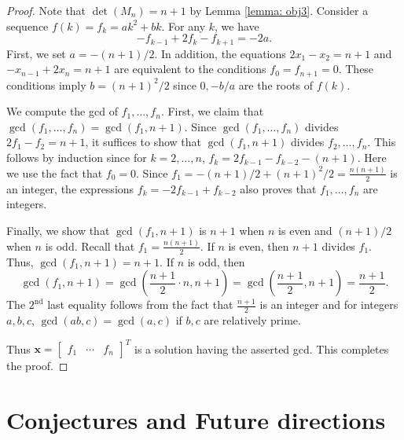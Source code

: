 \documentclass[11pt,reqno]{amsart}
\theoremstyle{definition}
\theoremstyle{plain}
\begin{document}
\begin{proof}
Note that $\det (M_n) = n+1$ by Lemma \ref{lemma: obj3}. Consider a sequence $f(k)=f_k  = ak^2 + bk$. 
For any $k$, we have
\[
-f_{k-1} + 2f_k - f_{k+1} = -2a.
\]
First, we set $a = -(n+1)/2$. 
In addition, the equations $2x_1 - x_2 = n+1$ and $-x_{n-1} + 2x_n = n+1$ are equivalent to the conditions $f_0 = f_{n+1} = 0$. 
These conditions imply $b = (n+1)^2/2$ since $0, -b/a$ are the roots of $f(k)$. 

We compute the gcd of $f_1,\dots, f_n$. 
First, we claim that $\gcd(f_1,\dots, f_n) = \gcd(f_1, n+1)$. 
Since $\gcd(f_1,\dots, f_n)$ divides $2f_1-f_2 = n+1$, 
it suffices to show that $\gcd(f_1, n+1)$ divides $f_2,\dots, f_n$. 
This follows by induction since for $k = 2, \dots, n$, 
$f_k = 2 f_{k-1} - f_{k-2} - (n+1)$.
Here we use the fact that $f_0 = 0$. 
Since $f_1 =  -(n+1)/2 + (n+1)^2/2 = \frac{n(n+1)}2$ is an integer, the expressions $f_k = -2 f_{k-1} + f_{k-2}$ also proves that $f_1, \dots, f_n$ are integers. 

Finally, we show that $\gcd(f_1, n+1)$ is $n+1$ when $n$ is even and $(n+1)/2$ when $n$ is odd. 
Recall that $f_1 = \frac{n(n+1)}2$.
If $n$ is even, then $n+1$ divides $f_1$. 
Thus, $\gcd(f_1, n+1) = n+1$. 
If $n$ is odd, then 
\[
\gcd(f_1, n+1) = \gcd(\frac{n+1}2 \cdot n, n+1) = \gcd(\frac{n+1}2, n+1) = \frac{n+1}2.
\] 
The $2^\textrm{nd}$ last equality follows from the fact that $\frac{n+1}2$ is an integer and for integers $a,b,c$, $\gcd(ab,c) = \gcd(a,c)$ if $b,c$ are relatively prime. 

Thus $\mathbf{x} = \begin{bmatrix} f_1 & \cdots & f_n \end{bmatrix}^T$ is a solution having the asserted gcd. 
This completes the proof. 
\end{proof}



\section{Conjectures and Future directions} \label{section: conjecture}

\end{document}
